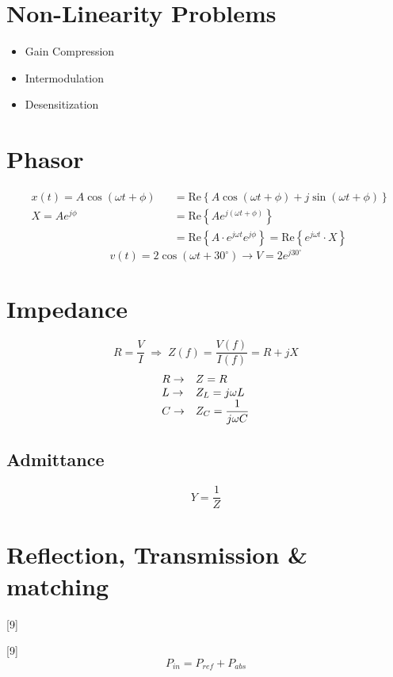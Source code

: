\documentclass[11pt,a4paper]{article}
\begin{document}
\section{Non-Linearity Problems}
\begin{itemize}[label=--,leftmargin=1.5em]
\item Gain Compression
\item Intermodulation
\item Desensitization
\end{itemize}

\section{Phasor}

\begin{align*}
& x(t) = A\cos(\omega t+\phi) && = \mathrm{Re}\left\{A\cos(\omega t+\phi) + j\sin(\omega t+\phi)\right\}\\
& X = Ae^{j\phi} && = \mathrm{Re}\left\{Ae^{j(\omega t+\phi)}\right\}\\
& && = \mathrm{Re}\left\{A\cdot e^{j\omega t}e^{j\phi}\right\} = \mathrm{Re}\left\{e^{j\omega t}\cdot X\right\}
\end{align*}
\[ v(t) = 2\cos(\omega t + 30^\circ) \rightarrow V = 2e^{j30^\circ} \]

\section{Impedance}
\[ R = \frac{V}{I} \;\Rightarrow\; Z(f) = \frac{V(f)}{I(f)} = R + jX \]
\[
\begin{array}{@{}l@{\quad}l@{}}
R \rightarrow & Z = R\\
L \rightarrow & Z_L = j\omega L\\
C \rightarrow & Z_C = \dfrac{1}{j\omega C}
\end{array}
\]

\subsection{Admittance}
\[ Y = \frac{1}{Z} \]

\section{Reflection, Transmission \& matching}
[9]

[9]
\[ P_{in} = P_{ref} + P_{abs} \]
\end{document}
